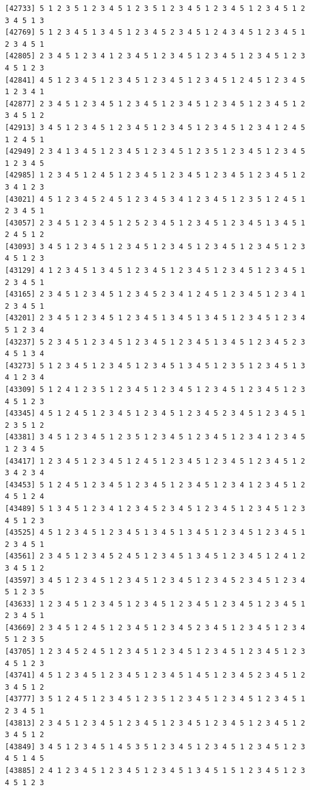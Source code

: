 \documentclass[
  11pt,
]{book}
\begin{document}
\begin{verbatim}
[42733] 5 1 2 3 5 1 2 3 4 5 1 2 3 5 1 2 3 4 5 1 2 3 4 5 1 2 3 4 5 1 2 3 4 5 1 3
[42769] 5 1 2 3 4 5 1 3 4 5 1 2 3 4 5 2 3 4 5 1 2 4 3 4 5 1 2 3 4 5 1 2 3 4 5 1
[42805] 2 3 4 5 1 2 3 4 1 2 3 4 5 1 2 3 4 5 1 2 3 4 5 1 2 3 4 5 1 2 3 4 5 1 2 3
[42841] 4 5 1 2 3 4 5 1 2 3 4 5 1 2 3 4 5 1 2 3 4 5 1 2 4 5 1 2 3 4 5 1 2 3 4 1
[42877] 2 3 4 5 1 2 3 4 5 1 2 3 4 5 1 2 3 4 5 1 2 3 4 5 1 2 3 4 5 1 2 3 4 5 1 2
[42913] 3 4 5 1 2 3 4 5 1 2 3 4 5 1 2 3 4 5 1 2 3 4 5 1 2 3 4 1 2 4 5 1 2 4 5 1
[42949] 2 3 4 1 3 4 5 1 2 3 4 5 1 2 3 4 5 1 2 3 5 1 2 3 4 5 1 2 3 4 5 1 2 3 4 5
[42985] 1 2 3 4 5 1 2 4 5 1 2 3 4 5 1 2 3 4 5 1 2 3 4 5 1 2 3 4 5 1 2 3 4 1 2 3
[43021] 4 5 1 2 3 4 5 2 4 5 1 2 3 4 5 3 4 1 2 3 4 5 1 2 3 5 1 2 4 5 1 2 3 4 5 1
[43057] 2 3 4 5 1 2 3 4 5 1 2 5 2 3 4 5 1 2 3 4 5 1 2 3 4 5 1 3 4 5 1 2 4 5 1 2
[43093] 3 4 5 1 2 3 4 5 1 2 3 4 5 1 2 3 4 5 1 2 3 4 5 1 2 3 4 5 1 2 3 4 5 1 2 3
[43129] 4 1 2 3 4 5 1 3 4 5 1 2 3 4 5 1 2 3 4 5 1 2 3 4 5 1 2 3 4 5 1 2 3 4 5 1
[43165] 2 3 4 5 1 2 3 4 5 1 2 3 4 5 2 3 4 1 2 4 5 1 2 3 4 5 1 2 3 4 1 2 3 4 5 1
[43201] 2 3 4 5 1 2 3 4 5 1 2 3 4 5 1 3 4 5 1 3 4 5 1 2 3 4 5 1 2 3 4 5 1 2 3 4
[43237] 5 2 3 4 5 1 2 3 4 5 1 2 3 4 5 1 2 3 4 5 1 3 4 5 1 2 3 4 5 2 3 4 5 1 3 4
[43273] 5 1 2 3 4 5 1 2 3 4 5 1 2 3 4 5 1 3 4 5 1 2 3 5 1 2 3 4 5 1 3 4 1 2 3 4
[43309] 5 1 2 4 1 2 3 5 1 2 3 4 5 1 2 3 4 5 1 2 3 4 5 1 2 3 4 5 1 2 3 4 5 1 2 3
[43345] 4 5 1 2 4 5 1 2 3 4 5 1 2 3 4 5 1 2 3 4 5 2 3 4 5 1 2 3 4 5 1 2 3 5 1 2
[43381] 3 4 5 1 2 3 4 5 1 2 3 5 1 2 3 4 5 1 2 3 4 5 1 2 3 4 1 2 3 4 5 1 2 3 4 5
[43417] 1 2 3 4 5 1 2 3 4 5 1 2 4 5 1 2 3 4 5 1 2 3 4 5 1 2 3 4 5 1 2 3 4 2 3 4
[43453] 5 1 2 4 5 1 2 3 4 5 1 2 3 4 5 1 2 3 4 5 1 2 3 4 1 2 3 4 5 1 2 4 5 1 2 4
[43489] 5 1 3 4 5 1 2 3 4 1 2 3 4 5 2 3 4 5 1 2 3 4 5 1 2 3 4 5 1 2 3 4 5 1 2 3
[43525] 4 5 1 2 3 4 5 1 2 3 4 5 1 3 4 5 1 3 4 5 1 2 3 4 5 1 2 3 4 5 1 2 3 4 5 1
[43561] 2 3 4 5 1 2 3 4 5 2 4 5 1 2 3 4 5 1 3 4 5 1 2 3 4 5 1 2 4 1 2 3 4 5 1 2
[43597] 3 4 5 1 2 3 4 5 1 2 3 4 5 1 2 3 4 5 1 2 3 4 5 2 3 4 5 1 2 3 4 5 1 2 3 5
[43633] 1 2 3 4 5 1 2 3 4 5 1 2 3 4 5 1 2 3 4 5 1 2 3 4 5 1 2 3 4 5 1 2 3 4 5 1
[43669] 2 3 4 5 1 2 4 5 1 2 3 4 5 1 2 3 4 5 2 3 4 5 1 2 3 4 5 1 2 3 4 5 1 2 3 5
[43705] 1 2 3 4 5 2 4 5 1 2 3 4 5 1 2 3 4 5 1 2 3 4 5 1 2 3 4 5 1 2 3 4 5 1 2 3
[43741] 4 5 1 2 3 4 5 1 2 3 4 5 1 2 3 4 5 1 4 5 1 2 3 4 5 2 3 4 5 1 2 3 4 5 1 2
[43777] 3 5 1 2 4 5 1 2 3 4 5 1 2 3 5 1 2 3 4 5 1 2 3 4 5 1 2 3 4 5 1 2 3 4 5 1
[43813] 2 3 4 5 1 2 3 4 5 1 2 3 4 5 1 2 3 4 5 1 2 3 4 5 1 2 3 4 5 1 2 3 4 5 1 2
[43849] 3 4 5 1 2 3 4 5 1 4 5 3 5 1 2 3 4 5 1 2 3 4 5 1 2 3 4 5 1 2 3 4 5 1 4 5
[43885] 2 4 1 2 3 4 5 1 2 3 4 5 1 2 3 4 5 1 3 4 5 1 5 1 2 3 4 5 1 2 3 4 5 1 2 3

\end{verbatim}
\end{document}
